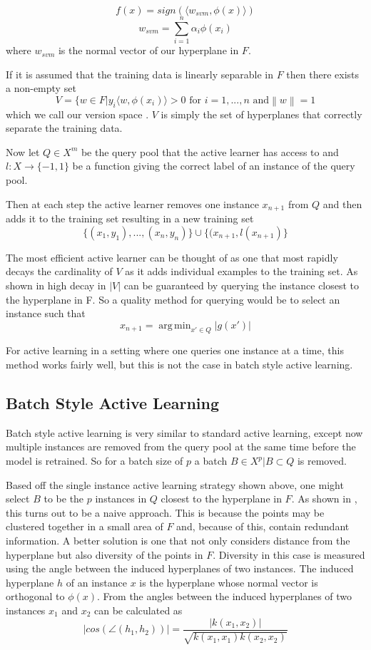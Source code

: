 \documentclass{article}
\newcommand\norm[1]{\left\lVert#1\right\rVert}
\DeclareMathOperator*{\argmin}{arg\,min}
\begin{document}
\[
f(x) = sign(\langle w_{svm}, \phi(x) \rangle)
\]
\[
w_{svm} = \sum_{i=1}^n \alpha_i \phi(x_i)
\]
where $w_{svm}$ is the normal vector of our hyperplane in $F$. 

If it is assumed that the training data is linearly separable in $F$ then there exists a non-empty set
\[
V = \{w \in F | y_i \langle w, \phi(x_i) \rangle > 0 \text{ for } i = 1, ...,n \text{ and} \norm{w} = 1
\]
which we call our version space \cite{version_space}. $V$ is simply the set of hyperplanes that correctly separate the training data.

Now let $Q \in X^m$ be the query pool that the active learner has access to and
$l : X \rightarrow \{-1,1\}$ be a function giving the correct label of an instance of the query pool.

Then at each step the active learner removes one instance $x_{n+1}$ from $Q$ and then adds it to the training set resulting in a new training set
\[
\{(x_1, y_1),...,(x_n,y_n)\}\cup\{(x_{n+1}, l(x_{n+1})\}
\]


The most efficient active learner can be thought of as one that most rapidly decays the cardinality of $V$ as it adds individual examples to the training set. As shown in \cite{active_learning} high decay in $|V|$ can be guaranteed by querying the instance closest to the hyperplane in F. So a quality method for querying would be to select an instance such that
\[
x_{n+1} = \argmin_{x' \in Q} |g(x')|
\]

For active learning in a setting where one queries one instance at a time, this method works fairly well, but this is not the case in batch style active learning. 

\subsection*{Batch Style Active Learning}

Batch style active learning is very similar to standard active learning, except now multiple instances are removed from the query pool at the same time before the model is retrained. So for a batch size of $p$ a batch
$B \in X^p | B \subset Q$ is removed.


Based off the single instance active learning strategy shown above, one might select $B$ to be the $p$ instances in $Q$ closest to the hyperplane in $F$. As shown in \cite{active_learning}, this turns out to be a naive approach. This is because the points may be clustered together in a small area of $F$ and, because of this, contain redundant information. A better solution is one that not only considers distance from the hyperplane but also diversity of the points in $F$. Diversity in this case is measured using the angle between the induced hyperplanes of two instances. The induced hyperplane $h$ of an instance $x$ is the hyperplane whose normal vector is orthogonal to $\phi(x)$. From \cite{active_learning} the angles between the induced hyperplanes of two instances $x_1$ and $x_2$ can be calculated as
\[
|cos(\angle(h_1, h_2))| = \frac{|k(x_1,x_2)|}{\sqrt{k(x_1,x_1)k(x_2, x_2)}}
\]
\end{document}
